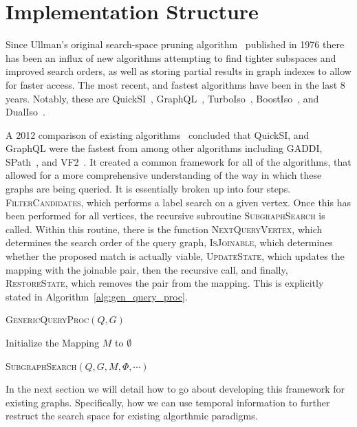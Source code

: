 \section{Implementation Structure}

Since Ullman's original search-space pruning algorithm~\cite{1976-ACMJ-Ullman}
published in 1976 there has been an influx of new algorithms attempting to find
tighter subspaces and improved search orders, as well as storing partial results
in graph indexes to allow for faster access.  The most recent, and fastest
algorithms have been in the last 8 years. Notably, these are
QuickSI~\cite{2008-VLDB-QuickSI}, GraphQL~\cite{2008-SIGMOD-GraphQL},
TurboIso~\cite{2013-SIGMOD-TurboISO}, BoostIso~\cite{2015-VLDB-BoostIso}, and
DualIso~\cite{2014-IEEE-DualIso}.

A 2012 comparison of existing algorithms~\cite{2012-VLDB-IsoSurvey} concluded
that QuickSI, and GraphQL were the fastest from among other algorithms including
GADDI, SPath~\cite{2010-VLDB-SPath}, and VF2~\cite{2004-PAMI-VF2}. It created a
common framework for all of the algorithms, that allowed for a more
comprehensive understanding of the way in which these graphs are being
queried. It is essentially broken up into four steps. \textsc{FilterCandidates},
which performs a label search on a given vertex.  Once this has been performed
for all vertices, the recursive subroutine \textsc{SubgraphSearch} is
called. Within this routine, there is the function \textsc{NextQueryVertex},
which determines the search order of the query graph, \textsc{IsJoinable}, which
determines whether the proposed match is actually viable, \textsc{UpdateState},
which updates the mapping with the joinable pair, then the recursive call, and
finally, \textsc{RestoreState}, which removes the pair from the mapping. This is
explicitly stated in Algorithm~\ref{alg:gen_query_proc}.

\begin{algorithm}
  \label{alg:gen_query_proc}
  \caption{\textsc{GenericQueryProc}$(Q,G)$}
  \SetAlgoLined

  Initialize the Mapping $M$ to $\emptyset$\;

  \textsc{SubgraphSearch}$(Q,G,M,\Phi, \cdots)$\;

  \setcounter{AlgoLine}{0}
\end{algorithm}

In the next section we will detail how to go about developing this framework for
existing graphs. Specifically, how we can use temporal information to further
restruct the search space for existing algorthmic paradigms.
